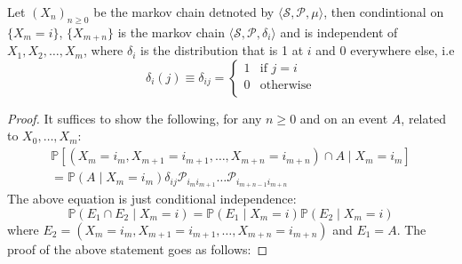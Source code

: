 \begin{theorem}
    Let \({(X_n)}_{n \geq  0} \) be the markov chain detnoted by \(\langle \mathcal{S} ,\mathcal{P} ,\mu  \rangle \),
then condintional on \(\{X_m = i\}\), \(\{X_{m+n} \}\) is the markov chain \(\langle \mathcal{S} ,\mathcal{P} , \delta _i \rangle \) 
and is independent of \(X_1, X_2, \dots , X_m\), where \(\delta _i\) is the distribution that is 1 at \(i\)
 and 0 everywhere else, i.e
 \[
        \delta _i (j) \equiv \delta_{ij} =  \begin{cases}
            1 & \text{if } j = i \\
            0 & \text{otherwise} \\
        \end{cases} 
 \]
\end{theorem}
\begin{proof}
    It suffices to show the following, for any \(n \geq 0\) and on an event \(A\), related to \(X_0,\dots , X_m\):
    \[
        \begin{aligned}
            \mathbb{P} \left[ 
                (X_m = i_m, X_{m+1} = i_{m+1}, \dots , X_{m+n} = i_{m+n}) \cap A \mid X_m = i_m 
                \right] \\ 
                = \mathbb{P} ( A \mid X_m=i_m) \delta_{ij} \mathcal{P} _{i_m i_{m+1}} \dots 
                \mathcal{P} _{i_{m+n-1} i_{m+n}} 
            \end{aligned}
    \]
    The above equation is just conditional independence:
    \[
        \mathbb{P} (E_1 \cap  E_2 \mid X_m = i) = \mathbb{P} (E_1 \mid X_m = i) \mathbb{P} (E_2 \mid X_m = i)
    \]
    where \(E_2 = (X_m = i_m, X_{m+1} = i_{m+1}, \dots , X_{m+n} = i_{m+n})\) and \(E_1 = A\). The proof of the above statement goes as follows:


\end{proof}

